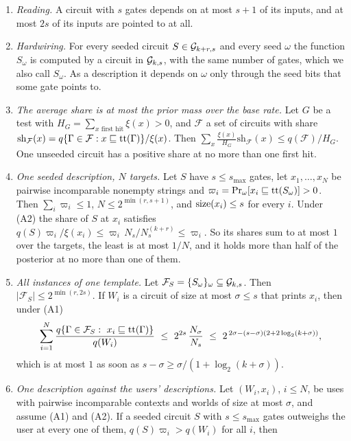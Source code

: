 \begin{theorem}\label{thm:c-refund}
\begin{enumerate}[label=(\alph*),leftmargin=2em,itemsep=2pt,topsep=2pt]
\item \emph{Reading.} A circuit with $s$ gates depends on at most $s+1$ of its inputs, and at most $2s$ of its
inputs are pointed to at all.
\item \emph{Hardwiring.} For every seeded circuit $S\in\mathcal G_{k+r,s}$ and every seed $\omega$ the function
$S_\omega$ is computed by a circuit in $\mathcal G_{k,s}$, with the same number of gates, which we also call
$S_\omega$. As a description it depends on $\omega$ only through the seed bits that some gate points to.
\item \emph{The average share is at most the prior mass over the base rate.} Let $G$ be a test with
$H_G=\sum_{x\text{ first hit}}\xi(x)>0$, and $\mathcal F$ a set of circuits with share
$\mathrm{sh}_{\mathcal F}(x)=q\{\Gamma\in\mathcal F:x\sqsubseteq\mathrm{tt}(\Gamma)\}/\xi(x)$. Then
$\sum_x\frac{\xi(x)}{H_G}\mathrm{sh}_{\mathcal F}(x)\le q(\mathcal F)/H_G$. One unseeded circuit has a
positive share at no more than one first hit.
\item \emph{One seeded description, $N$ targets.} Let $S$ have $s\le s_{\max}$ gates, let $x_1,\dots,x_N$ be
pairwise incomparable nonempty strings and $\varpi_i=\Pr_\omega[x_i\sqsubseteq\mathrm{tt}(S_\omega)]>0$. Then
$\sum_i\varpi_i\le1$, $N\le2^{\min(r,s+1)}$, and $\mathrm{size}(x_i)\le s$ for every $i$. Under (A2) the share of $S$
at $x_i$ satisfies $q(S)\varpi_i/\xi(x_i)\le\varpi_i\,N_s/N^{(k+r)}_s\le\varpi_i$. So its shares sum to at
most $1$ over the targets, the least is at most $1/N$, and it holds more than half of the posterior at no more
than one of them.
\item \emph{All instances of one template.} Let $\mathcal F_S=\{S_\omega\}_\omega\subseteq\mathcal G_{k,s}$. Then
$|\mathcal F_S|\le2^{\min(r,2s)}$. If $W_i$ is a circuit of size at most $\sigma\le s$ that prints $x_i$, then
under (A1)
\[
\sum_{i=1}^N\frac{q\{\Gamma\in\mathcal F_S:\ x_i\pre\ctt(\Gamma)\}}{q(W_i)}\ \le\
2^{2s}\,\frac{N_\sigma}{N_s}\ \le\
2^{\,2\sigma-(s-\sigma)(2+2\log_2(k+\sigma))},
\]
which is at most $1$ as soon as $s-\sigma\ge\sigma/(1+\log_2(k+\sigma))$.
\item \emph{One description against the users' descriptions.} Let $(W_i,x_i)$, $i\le N$, be uses with pairwise
incomparable contexts and worlds of size at most $\sigma$, and assume (A1) and (A2). If a seeded circuit $S$
with $s\le s_{\max}$ gates outweighs the user at every one of them, $q(S)\varpi_i>q(W_i)$ for all $i$, then

\end{enumerate}
\end{theorem}
